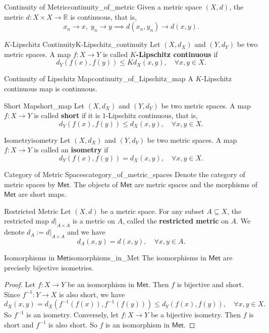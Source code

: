 \documentclass{report}
\begin{document}
\begin{proposition}{Continuity of Metric}{continuity_of_metric}
	Given a metric space $(X,d)$, the metric $d:X\times X\to \mathbb{R}$ is continuous, that is,
	\[
		x_n\to x,\; y_n\to y\implies d(x_n,y_n)\to d(x,y).
	\]
\end{proposition}
\begin{definition}{$K$-Lipschitz Continuity}{K-Lipschitz_continuity}
	Let $(X,d_X)$ and $(Y,d_Y)$ be two metric spaces. A map $f:X\to Y$ is called \textbf{$K$-Lipschitz continuous} if
	\[
		d_Y(f(x),f(y))\le Kd_X(x,y),\quad\forall x,y\in X.
	\]
\end{definition}
\begin{proposition}{Continuity of Lipschitz Map}{continuity_of_Lipschitz_map}
	A $K$-Lipschitz continuous map is continuous.
\end{proposition}
\begin{definition}{Short Map}{short_map}
	Let $(X,d_X)$ and $(Y,d_Y)$ be two metric spaces. A map $f:X\to Y$ is called \textbf{short} if it is $1$-Lipschitz continuous, that is,
	\[
		d_Y(f(x),f(y))\le d_X(x,y),\quad\forall x,y\in X.
	\]
\end{definition}
\begin{definition}{Isometry}{isometry}
	Let $(X,d_X)$ and $(Y,d_Y)$ be two metric spaces. A map $f:X\to Y$ is called an \textbf{isometry} if
	\[
		d_Y(f(x),f(y))=d_X(x,y),\quad\forall x,y\in X.
	\]
\end{definition}
\begin{definition}{Category of Metric Spaces}{category_of_metric_spaces}
	Denote the category of metric spaces by $\mathsf{Met}$. The objects of $\mathsf{Met}$ are metric spaces and the morphisms of $\mathsf{Met}$ are short maps.
\end{definition}

\begin{definition}{Restricted Metric}
	Let $(X,d)$ be a metric space. For any subset $A\subseteq X$, the restricted map $d|_{A\times A}$ is a metric on $A$, called the \textbf{restricted metric} on $A$. We denote $d_A:=d|_{A\times A}$ and we have
	\[
		d_A(x,y)=d(x,y),\quad\forall x,y\in A.
	\]
\end{definition}


\begin{proposition}{Isomorphisms in $\mathsf{Met}$}{isomorphisms_in_Met}
	The isomorphisms in $\mathsf{Met}$ are precisely bijective isometries.
\end{proposition}
\begin{proof}
	Let $f:X\to Y$ be an isomorphism in $\mathsf{Met}$. Then $f$ is bijective and short. Since $f^{-1}:Y\to X$ is also short, we have
	\[
		d_X(x,y)=d_X(f^{-1}(f(x)),f^{-1}(f(y)))\le d_Y(f(x),f(y)),\quad\forall x,y\in X.
	\]
	So $f^{-1}$ is an isometry. Conversely, let $f:X\to Y$ be a bijective isometry. Then $f$ is short and $f^{-1}$ is also short. So $f$ is an isomorphism in $\mathsf{Met}$.
\end{proof}
\end{document}

